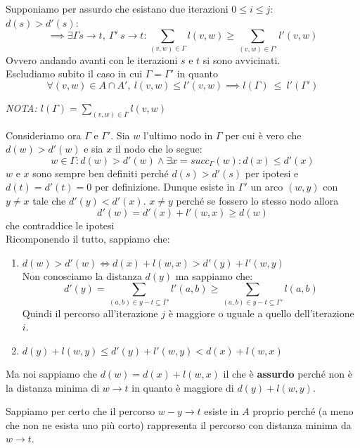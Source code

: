             Supponiamo per assurdo che esistano due iterazioni $0 \le i\le j :$\\$ d(s) > d'(s)$:
            \[\implies \exists \Gamma s\rightarrow t,\ \Gamma ' \ s \rightarrow t : \sum_{(v,w)\in \Gamma} l(v,w) \ge \sum_{(v,w)\in \Gamma'} l'(v,w)\]
            Ovvero andando avanti con le iterazioni $s$ e $t$ si sono avvicinati.\\
            Escludiamo subito il caso in cui $\Gamma = \Gamma'$ in quanto
            \[\forall (v,w)\in A\cap A',\  l(v,w) \le l'(v,w)\implies l(\Gamma)\ \le\ l'(\Gamma')\]
            \begin{center}
                \textit{NOTA: $l(\Gamma) = \sum_{(v,w)\in \Gamma} l(v,w)$}
            \end{center}
            Consideriamo ora $\Gamma$ e $\Gamma'$. Sia $w$ l'ultimo nodo in $\Gamma$ per cui è vero che $d(w)> d'(w)$ e sia $x$ il nodo che lo segue:
            \[w \in \Gamma : d(w) > d'(w) \land \exists x = succ_\Gamma(w) : d(x)\le d'(x)\]
            $w$ e $x$ sono sempre ben definiti perché $d(s)>d'(s)$ per ipotesi e $d(t) = d'(t) = 0$ per definizione.
            Dunque esiste in $\Gamma'$ un arco $(w,y)$ con $y \not = x$ tale che $d'(y) < d'(x)$. $x \not = y$ perché se fossero lo stesso nodo allora \[d'(w) = d'(x) + l'(w,x)\ge d(w)\]
                che contraddice le ipotesi\\
            Ricomponendo il tutto, sappiamo che:
            \begin{enumerate}
                \item $d(w)>d'(w) \iff d(x) + l(w,x) > d'(y) + l'(w,y)$ \\Non conosciamo la distanza $d(y)$ ma sappiamo che:
                \[d'(y) = \sum_{(a,b)\in y-t\subseteq \Gamma'}l'(a,b) \ge \sum_{(a,b)\in y-t\subseteq \Gamma'}l(a,b) \]
                Quindi il percorso all'iterazione $j$ è maggiore o uguale a quello dell'iterazione $i$.
                \item $d(y) +l(w,y) \le d'(y) +l'(w,y) < d(x) +l(w,x)$  
            \end{enumerate}
            Ma noi sappiamo che $d(w) = d(x) +l(w,x)$ il che è \textbf{assurdo} perché non è la distanza minima di $w\rightarrow t$ in quanto è maggiore di 
            $d(y) +l(w,y)$. 
            
            Sappiamo per certo che il percorso $w-y\rightarrow t$ esiste in $A$ proprio perché (a meno che non ne esista uno più corto) rappresenta il percorso con distanza minima da $w\rightarrow t$.

